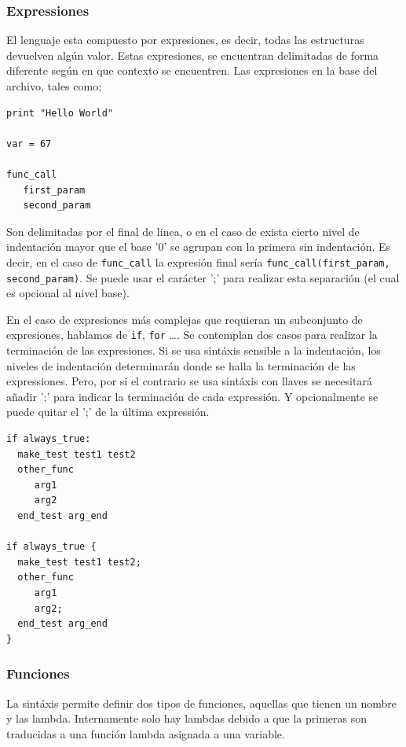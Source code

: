 \documentclass[11pt]{article}
\begin{document}
\subsubsection{Expressiones}
\label{sec:orgef1f2fc}
El lenguaje esta compuesto por expresiones, es decir, todas las estructuras devuelven algún valor. Estas expresiones, se encuentran delimitadas de forma diferente según en que contexto
se encuentren.
Las expresiones en la base del archivo, tales como;
\begin{verbatim}
print "Hello World"

var = 67

func_call
   first_param
   second_param
\end{verbatim}

Son delimitadas por el final de linea, o en el caso de exista cierto nivel de indentación mayor que el base '0' se agrupan con la primera sin indentación. Es decir, en el caso de \texttt{func\_call}
la expresión final sería \texttt{func\_call(first\_param, second\_param)}. Se puede usar el carácter ';' para realizar esta separación (el cual es opcional al nivel base).

En el caso de expresiones más complejas que requieran un subconjunto de expresiones, hablamos de \texttt{if}, \texttt{for} \ldots{}. Se contemplan dos casos para realizar la terminación de las expresiones.
Si se usa sintáxis sensible a la indentación, los niveles de indentación determinarán donde se halla la terminación de las expressiones. Pero, por si el contrario se usa sintáxis con llaves
se necesitará añadir ';' para indicar la terminación de cada expressión. Y opcionalmente se puede quitar el ';' de la última expressión.

\begin{verbatim}
if always_true:
  make_test test1 test2
  other_func
     arg1
     arg2
  end_test arg_end

if always_true {
  make_test test1 test2;
  other_func
     arg1
     arg2;
  end_test arg_end
}
\end{verbatim}

\subsubsection{Funciones}
\label{sec:orgdec359a}

La sintáxis permite definir dos tipos de funciones, aquellas que tienen un nombre y las lambda. Internamente solo hay lambdas debido
a que la primeras son traducidas a una función lambda asignada a una variable.
\end{document}

